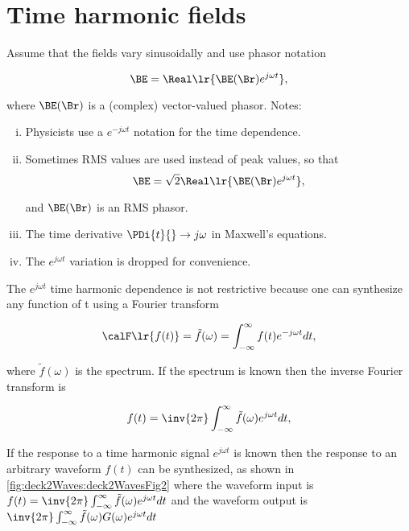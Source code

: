 \section{Time harmonic fields}

Assume that the fields vary sinusoidally and use phasor notation

\begin{equation}\label{eqn:uwavesLecture2:680}
\BE = \Real\lr{ \BE(\Br) e^{j \omega t} },
\end{equation}

where \( \BE(\Br) \) is a (complex) vector-valued phasor.  Notes:

\begin{enumerate}[(i)]
\item Physicists use a \( e^{-j \omega t} \) notation for the time dependence.
\item Sometimes RMS values are used instead of peak values, so that
\begin{equation}\label{eqn:uwavesLecture2:700}
\BE = \sqrt{2} \Real\lr{ \BE(\Br) e^{j \omega t} },
\end{equation}

and \( \BE(\Br) \) is an RMS phasor.
\item The time derivative \( \PDi{t}{} \rightarrow j\omega \) in Maxwell's equations.
\item The \( e^{j \omega t} \) variation is dropped for convenience.
\end{enumerate}

The \( e^{j \omega t} \) time harmonic dependence is not restrictive because one can synthesize any function of t using a Fourier transform

\begin{equation}\label{eqn:uwavesLecture2:720}
\calF \lr{ f(t) } = \tilde{f}(\omega) = \int_{-\infty}^\infty f(t) e^{-j \omega t} dt,
\end{equation}

where \( \tilde{f}(\omega) \) is the spectrum.  If the spectrum is known then the inverse Fourier transform is

\begin{equation}\label{eqn:uwavesLecture2:740}
f(t) = \inv{2 \pi} \int_{-\infty}^\infty \tilde{f}(\omega) e^{j \omega t} dt,
\end{equation}

If the response to a time harmonic signal \( e^{j \omega t} \) is known then the response to an arbitrary waveform \( f(t) \) can be synthesized, as shown in 
\cref{fig:deck2Waves:deck2WavesFig2}
where the waveform input is \( f(t) = \inv{2 \pi} \int_{-\infty}^\infty \tilde{f}(\omega) e^{j \omega t} dt \) and the waveform output is \( \inv{2 \pi} \int_{-\infty}^\infty \tilde{f}(\omega) G(\omega) e^{j \omega t} dt \)

